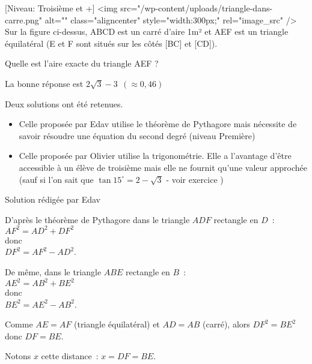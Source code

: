 
%
[Niveau: Troisième et +]
<img src="/wp-content/uploads/triangle-dans-carre.png" alt="" class="aligncenter" style="width:300px;" rel="image_src" />
Sur la figure ci-dessus, ABCD est un carré d'aire 1m² et AEF est un triangle équilatéral (E et F sont situés sur les côtés [BC] et [CD]).
\par
Quelle est l'aire exacte du triangle AEF ?
\begin{solution}
     \begin{note}
          La bonne réponse est $2 \sqrt{3}-3 \ \ ( \approx 0,46) $
          \par
          Deux solutions ont été retenues.
          \begin{itemize}
               \item
               Celle proposée par Edav utilise le théorème de Pythagore mais nécessite de savoir résoudre une équation du second degré (niveau Première)
               \item
               Celle proposée par Olivier utilise la trigonométrie. Elle a l'avantage d'être accessible à un élève de troisième mais elle ne fournit qu'une valeur approchée (sauf si l'on sait que $\tan 15^{\circ}=  2-\sqrt{3}$ - voir exercice )
          \end{itemize}
     \end{note}
     Solution rédigée par Edav
\begin{note}
  D'après le théorème de Pythagore dans le triangle $ ADF $ rectangle en $ D $~:
\\
$ AF^2 = AD^2 + DF^2 $
\\
donc
\\
$ DF^2 = AF^2 - AD^2 $.
\par
De même, dans le triangle $ ABE $ rectangle en $ B $~:
\\
$ AE^2 = AB^2 + BE^2 $
\\
donc
\\
$ BE^2 = AE^2 - AB^2 $.
\par
Comme $ AE = AF $ (triangle équilatéral) et $ AD = AB $ (carré), alors $ DF^2 = BE^2 $ donc $  DF = BE $.
\par
Notons $ x $ cette distance~: $ x = DF = BE $.
\end{note}
\medskip
     \par



\end{solution}

